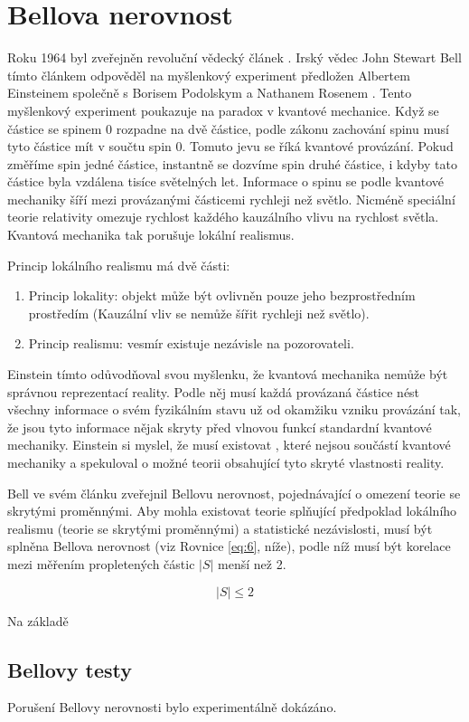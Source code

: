 \section{Bellova nerovnost}
Roku 1964 byl zveřejněn revoluční vědecký článek \parencite{bellineq}. Irský vědec John Stewart Bell tímto článkem odpověděl na myšlenkový experiment předložen Albertem Einsteinem společně s Borisem Podolskym a Nathanem Rosenem \parencite*{eprpar}. Tento myšlenkový experiment poukazuje na paradox v kvantové mechanice. Když se částice se spinem 0 rozpadne na dvě částice, podle zákonu zachování spinu musí tyto částice mít v součtu spin 0. Tomuto jevu se říká kvantové provázání. Pokud změříme spin jedné částice, instantně se dozvíme spin druhé částice, i kdyby tato částice byla vzdálena tisíce světelných let. Informace o spinu se podle kvantové mechaniky šíří mezi provázanými částicemi rychleji než světlo. Nicméně speciální teorie relativity omezuje rychlost každého kauzálního vlivu na rychlost světla. Kvantová mechanika tak porušuje lokální realismus.

Princip lokálního realismu má dvě části:
    \begin{enumerate}
        \item Princip lokality: objekt může být ovlivněn pouze jeho bezprostředním prostředím (Kauzální vliv se nemůže šířit rychleji než světlo). \parencite{lokalita}
        \item Princip realismu: vesmír existuje nezávisle na pozorovateli. \parencite{realismus}
    \end{enumerate}
    
Einstein tímto odůvodňoval svou myšlenku, že kvantová mechanika nemůže být správnou reprezentací reality. Podle něj musí každá provázaná částice nést všechny informace o svém fyzikálním stavu už od okamžiku vzniku provázání tak, že jsou tyto informace nějak skryty před vlnovou funkcí standardní kvantové mechaniky. Einstein si myslel, že musí existovat , které nejsou součástí kvantové mechaniky a spekuloval o možné teorii obsahující tyto skryté vlastnosti reality.

Bell ve svém článku \parencite*{bellineq} zveřejnil Bellovu nerovnost, pojednávající o omezení teorie se skrytými proměnnými. Aby mohla existovat teorie splňující předpoklad lokálního realismu (teorie se skrytými proměnnými) a statistické nezávislosti, musí být splněna Bellova nerovnost (viz Rovnice \ref{eq:6}, níže), podle níž musí být korelace mezi měřením propletených částic $|S|$ menší než 2.

\begin{equation}
    |S| \leq 2
    \label{eq:6}
\end{equation}

Na základě 

\subsection{Bellovy testy}
Porušení Bellovy nerovnosti bylo experimentálně dokázáno. 